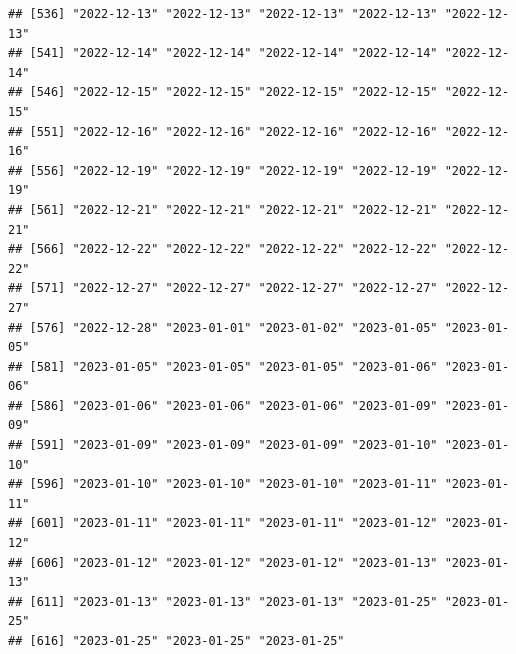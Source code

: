 \documentclass[
]{article}
\newenvironment{Shaded}{\begin{snugshade}}{\end{snugshade}}
\newcommand{\CommentTok}[1]{\textcolor[rgb]{0.56,0.35,0.01}{\textit{#1}}}
\newcommand{\FunctionTok}[1]{\textcolor[rgb]{0.00,0.00,0.00}{#1}}
\newcommand{\NormalTok}[1]{#1}
\newcommand{\OtherTok}[1]{\textcolor[rgb]{0.56,0.35,0.01}{#1}}
\newcommand{\SpecialCharTok}[1]{\textcolor[rgb]{0.00,0.00,0.00}{#1}}
\begin{document}
\begin{verbatim}
## [536] "2022-12-13" "2022-12-13" "2022-12-13" "2022-12-13" "2022-12-13"
## [541] "2022-12-14" "2022-12-14" "2022-12-14" "2022-12-14" "2022-12-14"
## [546] "2022-12-15" "2022-12-15" "2022-12-15" "2022-12-15" "2022-12-15"
## [551] "2022-12-16" "2022-12-16" "2022-12-16" "2022-12-16" "2022-12-16"
## [556] "2022-12-19" "2022-12-19" "2022-12-19" "2022-12-19" "2022-12-19"
## [561] "2022-12-21" "2022-12-21" "2022-12-21" "2022-12-21" "2022-12-21"
## [566] "2022-12-22" "2022-12-22" "2022-12-22" "2022-12-22" "2022-12-22"
## [571] "2022-12-27" "2022-12-27" "2022-12-27" "2022-12-27" "2022-12-27"
## [576] "2022-12-28" "2023-01-01" "2023-01-02" "2023-01-05" "2023-01-05"
## [581] "2023-01-05" "2023-01-05" "2023-01-05" "2023-01-06" "2023-01-06"
## [586] "2023-01-06" "2023-01-06" "2023-01-06" "2023-01-09" "2023-01-09"
## [591] "2023-01-09" "2023-01-09" "2023-01-09" "2023-01-10" "2023-01-10"
## [596] "2023-01-10" "2023-01-10" "2023-01-10" "2023-01-11" "2023-01-11"
## [601] "2023-01-11" "2023-01-11" "2023-01-11" "2023-01-12" "2023-01-12"
## [606] "2023-01-12" "2023-01-12" "2023-01-12" "2023-01-13" "2023-01-13"
## [611] "2023-01-13" "2023-01-13" "2023-01-13" "2023-01-25" "2023-01-25"
## [616] "2023-01-25" "2023-01-25" "2023-01-25"
\end{verbatim}

\begin{Shaded}
\end{Shaded}
\end{document}
